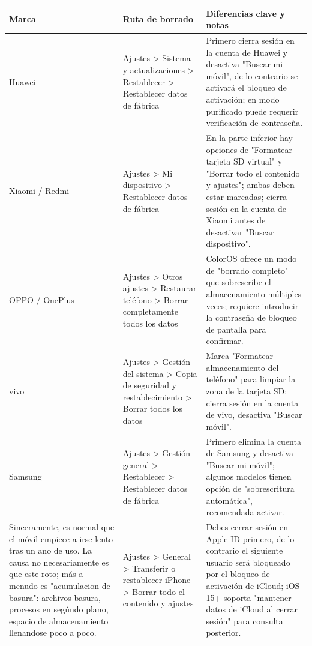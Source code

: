 \begin{center}
\begin{tabularx}{\linewidth}{|X|X|X|}
\hline
\textbf{Marca} & \textbf{Ruta de borrado} & \textbf{Diferencias clave y notas} \tabularnewline
\hline
Huawei & Ajustes > Sistema y actualizaciones > Restablecer > Restablecer datos de fábrica & Primero cierra sesión en la cuenta de Huawei y desactiva "Buscar mi móvil", de lo contrario se activará el bloqueo de activación; en modo purificado puede requerir verificación de contraseña. \tabularnewline
Xiaomi / Redmi & Ajustes > Mi dispositivo > Restablecer datos de fábrica & En la parte inferior hay opciones de "Formatear tarjeta SD virtual" y "Borrar todo el contenido y ajustes"; ambas deben estar marcadas; cierra sesión en la cuenta de Xiaomi antes de desactivar "Buscar dispositivo". \tabularnewline
OPPO / OnePlus & Ajustes > Otros ajustes > Restaurar teléfono > Borrar completamente todos los datos & ColorOS ofrece un modo de "borrado completo" que sobrescribe el almacenamiento múltiples veces; requiere introducir la contraseña de bloqueo de pantalla para confirmar. \tabularnewline
vivo & Ajustes > Gestión del sistema > Copia de seguridad y restablecimiento > Borrar todos los datos & Marca "Formatear almacenamiento del teléfono" para limpiar la zona de la tarjeta SD; cierra sesión en la cuenta de vivo, desactiva "Buscar móvil". \tabularnewline
Samsung & Ajustes > Gestión general > Restablecer > Restablecer datos de fábrica & Primero elimina la cuenta de Samsung y desactiva "Buscar mi móvil"; algunos modelos tienen opción de "sobrescritura automática", recomendada activar. \tabularnewline
Sinceramente, es normal que el móvil empiece a irse lento tras un ano de uso. La causa no necesariamente es que este roto; más a menudo es "acumulacion de basura": archivos basura, procesos en segúndo plano, espacio de almacenamiento llenandose poco a poco. & Ajustes > General > Transferir o restablecer iPhone > Borrar todo el contenido y ajustes & Debes cerrar sesión en Apple ID primero, de lo contrario el siguiente usuario será bloqueado por el bloqueo de activación de iCloud; iOS 15+ soporta "mantener datos de iCloud al cerrar sesión" para consulta posterior. \tabularnewline
\hline
\end{tabularx}
\end{center}

